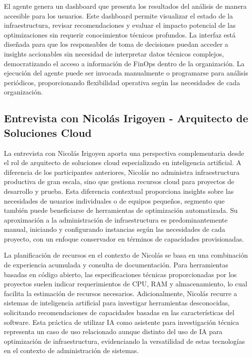El agente genera un dashboard que presenta los resultados del análisis de manera accesible para los usuarios. Este dashboard permite visualizar el estado de la infraestructura, revisar recomendaciones y evaluar el impacto potencial de las optimizaciones sin requerir conocimientos técnicos profundos. La interfaz está diseñada para que los responsables de toma de decisiones puedan acceder a insights accionables sin necesidad de interpretar datos técnicos complejos, democratizando el acceso a información de FinOps dentro de la organización. La ejecución del agente puede ser invocada manualmente o programarse para análisis periódicos, proporcionando flexibilidad operativa según las necesidades de cada organización.

\subsection{Entrevista con Nicolás Irigoyen - Arquitecto de Soluciones Cloud}

La entrevista con Nicolás Irigoyen aporta una perspectiva complementaria desde el rol de arquitecto de soluciones cloud especializado en inteligencia artificial. A diferencia de los participantes anteriores, Nicolás no administra infraestructura productiva de gran escala, sino que gestiona recursos cloud para proyectos de desarrollo y prueba. Esta diferencia contextual proporciona insights sobre las necesidades de usuarios individuales o de equipos pequeños, segmento que también puede beneficiarse de herramientas de optimización automatizada. Su aproximación a la administración de infraestructura es predominantemente manual, iniciando y configurando instancias según las necesidades de cada proyecto, con un enfoque conservador en términos de capacidades provisionadas.

La planificación de recursos en el contexto de Nicolás se basa en una combinación de experiencia acumulada y consulta de documentación. Para herramientas basadas en código abierto, las especificaciones técnicas proporcionadas por los proyectos suelen indicar requerimientos de CPU, RAM y almacenamiento, lo cual facilita la estimación de recursos necesarios. Adicionalmente, Nicolás recurre a sistemas de inteligencia artificial para investigar herramientas desconocidas, solicitando recomendaciones de capacidades basadas en las características del software. Esta práctica de utilizar IA como asistente para investigación técnica representa un caso de uso relacionado aunque distinto del uso de IA para optimización de infraestructura, evidenciando la versatilidad de estas tecnologías en el contexto de administración de sistemas.


